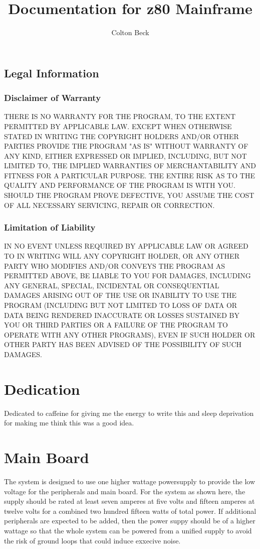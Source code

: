 \documentclass{book}
\begin{document}
\frontmatter
\title{Documentation for z80 Mainframe}
\author{Colton Beck}
\maketitle
\section*{Legal Information}
\subsection*{Disclaimer of Warranty}

  THERE IS NO WARRANTY FOR THE PROGRAM, TO THE EXTENT PERMITTED BY
APPLICABLE LAW.  EXCEPT WHEN OTHERWISE STATED IN WRITING THE COPYRIGHT
HOLDERS AND/OR OTHER PARTIES PROVIDE THE PROGRAM "AS IS" WITHOUT WARRANTY
OF ANY KIND, EITHER EXPRESSED OR IMPLIED, INCLUDING, BUT NOT LIMITED TO,
THE IMPLIED WARRANTIES OF MERCHANTABILITY AND FITNESS FOR A PARTICULAR
PURPOSE.  THE ENTIRE RISK AS TO THE QUALITY AND PERFORMANCE OF THE PROGRAM
IS WITH YOU.  SHOULD THE PROGRAM PROVE DEFECTIVE, YOU ASSUME THE COST OF
ALL NECESSARY SERVICING, REPAIR OR CORRECTION.

\subsection*{Limitation of Liability}

  IN NO EVENT UNLESS REQUIRED BY APPLICABLE LAW OR AGREED TO IN WRITING
WILL ANY COPYRIGHT HOLDER, OR ANY OTHER PARTY WHO MODIFIES AND/OR CONVEYS
THE PROGRAM AS PERMITTED ABOVE, BE LIABLE TO YOU FOR DAMAGES, INCLUDING ANY
GENERAL, SPECIAL, INCIDENTAL OR CONSEQUENTIAL DAMAGES ARISING OUT OF THE
USE OR INABILITY TO USE THE PROGRAM (INCLUDING BUT NOT LIMITED TO LOSS OF
DATA OR DATA BEING RENDERED INACCURATE OR LOSSES SUSTAINED BY YOU OR THIRD
PARTIES OR A FAILURE OF THE PROGRAM TO OPERATE WITH ANY OTHER PROGRAMS),
EVEN IF SUCH HOLDER OR OTHER PARTY HAS BEEN ADVISED OF THE POSSIBILITY OF
SUCH DAMAGES.
\chapter*{Dedication}
Dedicated to caffeine for giving me the energy to write this and sleep deprivation for making me think this was a good idea.
\tableofcontents
\listoffigures
\listoftables
\mainmatter
\chapter{Main Board}
The system is designed to use one higher wattage powersupply to provide the low voltage for the peripherals and main board. For the system as shown here, the supply should be rated at least seven amperes at five volts and fifteen amperes at twelve volts for a combined two hundred fifteen watts of total power. If additional peripherals are expected to be added, then the power suppy should be of a higher wattage so that the whole system can be powered from a unified supply to avoid the risk of ground loops that could induce exxecive noise.
\end{document}
